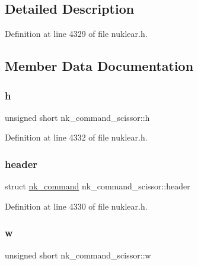 \subsection{Detailed Description}


Definition at line 4329 of file nuklear.\+h.



\subsection{Member Data Documentation}
\mbox{\label{structnk__command__scissor_a6d6412b7991f81796c8c30283cc15a37}} 
\subsubsection{\texorpdfstring{h}{h}}
{\footnotesize\ttfamily unsigned short nk\+\_\+command\+\_\+scissor\+::h}



Definition at line 4332 of file nuklear.\+h.

\mbox{\label{structnk__command__scissor_aeddedae36988a3f957d8a56802152b8a}} 
\subsubsection{\texorpdfstring{header}{header}}
{\footnotesize\ttfamily struct \mbox{\hyperlink{structnk__command}{nk\+\_\+command}} nk\+\_\+command\+\_\+scissor\+::header}



Definition at line 4330 of file nuklear.\+h.

\mbox{\label{structnk__command__scissor_a7659c8208820f4636b65c10f78c662cc}} 
\subsubsection{\texorpdfstring{w}{w}}
{\footnotesize\ttfamily unsigned short nk\+\_\+command\+\_\+scissor\+::w}



